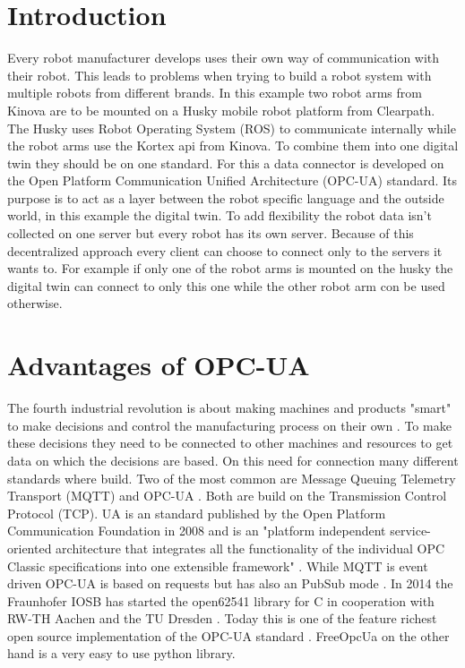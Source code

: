 \documentclass[conference]{IEEEtran}
\begin{document}
\section{Introduction}
Every robot manufacturer develops uses their own way of communication with their robot.
This leads to problems when trying to build a robot system with multiple robots from different brands.
In this example two robot arms from Kinova are to be mounted on a Husky mobile robot platform from Clearpath.
The Husky uses Robot Operating System (ROS) to communicate internally while the robot arms use the Kortex api from Kinova.
To combine them into one digital twin they should be on one standard.
For this a data connector is developed on the Open Platform Communication Unified Architecture (OPC-UA) standard.
Its purpose is to act as a layer between the robot specific language and the outside world, in this example the digital twin.
To add flexibility the robot data isn't collected on one server but every robot has its own server.
Because of this decentralized approach every client can choose to connect only to the servers it wants to.
For example if only one of the robot arms is mounted on the husky the digital twin can connect to only this one while the other robot arm con be used otherwise.
\section{Advantages of OPC-UA}
The fourth industrial revolution is about making machines and products "smart" to make decisions and control the manufacturing process on their own \cite{Industry4}.
To make these decisions they need to be connected to other machines and resources to get data on which the decisions are based.
On this need for connection many different standards where build.
Two of the most common are Message Queuing Telemetry Transport (MQTT) and OPC-UA \cite{CommTechnology}.
Both are build on the Transmission Control Protocol (TCP).
UA is an standard published by the Open Platform Communication Foundation in 2008 and is an "platform independent service-oriented architecture that integrates all the functionality of the individual OPC Classic specifications into one extensible framework" \cite{OPCUA}.
While MQTT is event driven OPC-UA is based on requests but has also an PubSub mode \cite{OPCUA}. 
In 2014 the Fraunhofer IOSB has started the open62541 library for C in cooperation with RW-TH Aachen and the TU Dresden \cite{open62541}.
Today this is one of the feature richest open source implementation of the OPC-UA standard \cite{ComparOPCUAPaper}.
FreeOpcUa on the other hand is a very easy to use python library. 
\end{document}
